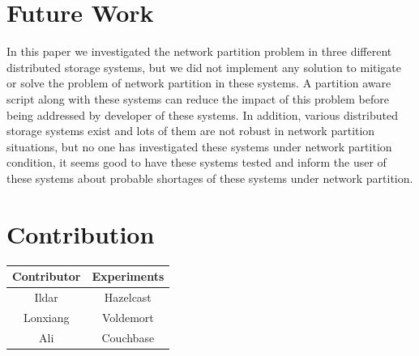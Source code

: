 \documentclass[a4paper]{article}
\begin{document}
\section{Future Work}
In this paper we investigated the network partition problem in three different distributed storage systems, but we did not implement any solution to mitigate or solve the problem of network partition in these systems. A partition aware script along with these systems can reduce the impact of this problem before being addressed by developer of these systems.
In addition, various distributed storage systems exist and lots of them are not robust in network partition situations, but no one has investigated these systems under network partition condition, it seems good to have these systems tested and inform the user of these systems about probable shortages of these systems under network partition.


\section*{Contribution}

\begin{table}[h]
	\centering
	\begin{tabular}{|c|c|}
		\hline
		\rowcolor{light-gray} \textbf{Contributor} & \textbf{Experiments} \\ \hline
		Ildar & Hazelcast  \\ \hline
		Lonxiang & Voldemort  \\ \hline
		Ali & Couchbase  \\ \hline
	\end{tabular}
\end{table}

\printbibliography
\end{document}
